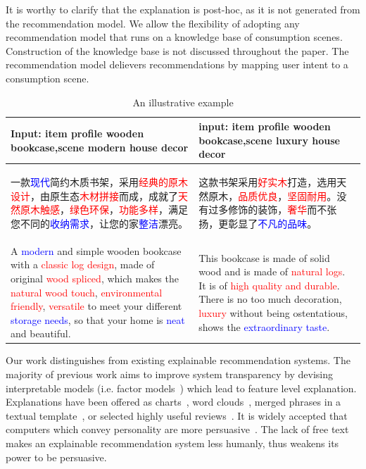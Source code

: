 \documentclass[sigconf]{acmart}
\begin{document}
It is worthy to clarify that the explanation is post-hoc, as it is not generated from the recommendation model. We allow the flexibility of adopting any recommendation model that runs on a knowledge base of consumption scenes. Construction of the knowledge base  is not discussed throughout the paper. The recommendation model delievers recommendations by mapping user intent to a consumption scene. 


\begin{table}\label{tab:example}
  \caption{An illustrative example}
  \label{table:example}
  \begin{tabular}{p{8cm} p{8cm}}
    \toprule
    Input: item profile wooden bookcase,scene modern house decor & input: item profile wooden bookcase,scene luxury house decor \\
    \midrule
    \begin{CJK*}{UTF8}{gbsn}
        一款\textcolor{blue}{现代}简约木质书架，采用\textcolor{red}{经典的原木设计}，由原生态\textcolor{red}{木材拼接}而成，成就了\textcolor{red}{天然原木触感}，\textcolor{red}{绿色环保}，\textcolor{red}{功能多样}，满足您不同的\textcolor{blue}{收纳需求}，让您的家\textcolor{blue}{整洁}漂亮。
    \end{CJK*} & 
    \begin{CJK*}{UTF8}{gbsn}
        这款书架采用\textcolor{red}{好实木}打造，选用天然原木，\textcolor{red}{品质优良}，\textcolor{red}{坚固耐用}。没有过多修饰的装饰，\textcolor{red}{奢华}而不张扬，更彰显了\textcolor{blue}{不凡的品味}。 
    \end{CJK*}\\
    A \textcolor{blue}{modern} and simple wooden bookcase with a \textcolor{red}{classic log design}, made of original \textcolor{red}{wood spliced}, which makes the \textcolor{red}{ natural wood touch}, \textcolor{red}{environmental friendly}, \textcolor{red}{versatile} to meet your different \textcolor{blue}{storage needs}, so that your home is \textcolor{blue}{neat} and beautiful.  &
    This bookcase is made of solid wood and is made of\textcolor{red}{ natural logs}. It is of \textcolor{red}{ high quality and durable}. There is no too much decoration, \textcolor{red}{luxury} without being ostentatious, shows the \textcolor{blue}{extraordinary taste}.\\
    \bottomrule
\end{tabular}
\end{table}


Our work distinguishes from existing explainable recommendation systems. The majority of previous work aims to improve system transparency by devising interpretable models (i.e. factor models~\cite{Zhang2014Explicit,Zhang2015Daily,Wu2015FLAME}) which lead to feature level explanation. Explanations have been offered as charts~\cite{Zhao2016Exploring}, word clouds~\cite{Wu2015FLAME}, merged phrases in a textual template~\cite{Zhang2014Explicit,Zhang2015Daily}, or selected highly useful reviews~\cite{Chen2018Neural}. 
It is widely accepted that computers which convey personality are more persuasive~\cite{Yoo2011Creating}. The lack of free text makes an explainable recommendation system less humanly, thus weakens its power to be persuasive. 
\end{document}

